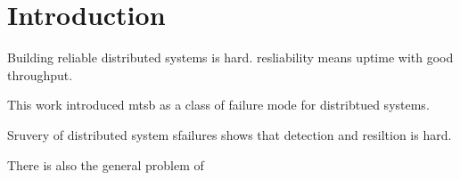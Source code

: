 \section{Introduction}
\label{sec:intro}


Building reliable distributed systems is hard. resliability means uptime with good throughput.

This\cite{mtsb_hotos} work introduced mtsb as a class of failure mode for distribtued systems.

Sruvery of distributed system sfailures shows that detection and resiltion is hard.

There is also the general problem of 